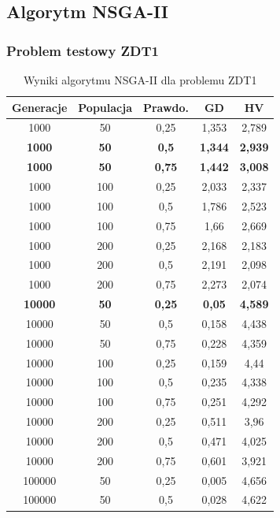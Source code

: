 \documentclass{classrep}
\begin{document}
\subsection{Algorytm NSGA-II}

\subsubsection{Problem testowy ZDT1}

\begin{table}[H]
\centering
\caption{Wyniki algorytmu NSGA-II dla problemu ZDT1}
\label{tab:NSGAII_ZDT1}
\begin{tabular}{|ccc|c|c|}
\hline
\textbf{Generacje} & \textbf{Populacja} & \textbf{Prawdo.} & \textbf{GD} & \textbf{HV} \\ \hline
1000 & 50 & 0,25 & 1,353 & 2,789 \\ \hline
\textbf{1000} & \textbf{50} & \textbf{0,5} & \textbf{1,344} & \textbf{2,939} \\ \hline
\textbf{1000} & \textbf{50} & \textbf{0,75} & \textbf{1,442} & \textbf{3,008} \\ \hline
1000 & 100 & 0,25 & 2,033 & 2,337 \\ \hline
1000 & 100 & 0,5 & 1,786 & 2,523 \\ \hline
1000 & 100 & 0,75 & 1,66 & 2,669 \\ \hline
1000 & 200 & 0,25 & 2,168 & 2,183 \\ \hline
1000 & 200 & 0,5 & 2,191 & 2,098 \\ \hline
1000 & 200 & 0,75 & 2,273 & 2,074 \\ \hline
\textbf{10000} & \textbf{50} & \textbf{0,25} & \textbf{0,05} & \textbf{4,589} \\ \hline
10000 & 50 & 0,5 & 0,158 & 4,438 \\ \hline
10000 & 50 & 0,75 & 0,228 & 4,359 \\ \hline
10000 & 100 & 0,25 & 0,159 & 4,44 \\ \hline
10000 & 100 & 0,5 & 0,235 & 4,338 \\ \hline
10000 & 100 & 0,75 & 0,251 & 4,292 \\ \hline
10000 & 200 & 0,25 & 0,511 & 3,96 \\ \hline
10000 & 200 & 0,5 & 0,471 & 4,025 \\ \hline
10000 & 200 & 0,75 & 0,601 & 3,921 \\ \hline
100000 & 50 & 0,25 & 0,005 & 4,656 \\ \hline
100000 & 50 & 0,5 & 0,028 & 4,622 \\ \hline

\end{tabular}
\end{table}
\end{document}
